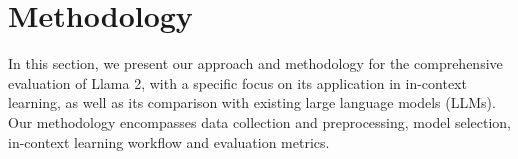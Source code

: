 \documentclass[conference]{IEEEtran}
\begin{document}


\section{Methodology}
In this section, we present our approach and methodology for the comprehensive evaluation of Llama 2, with a specific focus on its application in in-context learning, as well as its comparison with existing large language models (LLMs). Our methodology encompasses data collection and preprocessing, model selection, in-context learning workflow and evaluation metrics.


\end{document}
